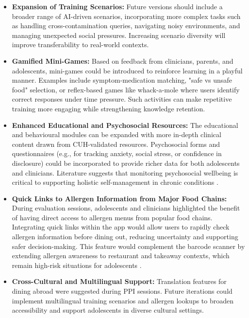 \documentclass[MScCS]{uccthesis}
\begin{document}
\begin{itemize}
    \item \textbf{Expansion of Training Scenarios:} Future versions should include a broader range of AI-driven scenarios, incorporating more complex tasks such as handling cross-contamination queries, navigating noisy environments, and managing unexpected social pressures. Increasing scenario diversity will improve transferability to real-world contexts.  

    \item \textbf{Gamified Mini-Games:} Based on feedback from clinicians, parents, and adolescents, mini-games could be introduced to reinforce learning in a playful manner. Examples include symptom-medication matching, "safe vs unsafe food" selection, or reflex-based games like whack-a-mole where users identify correct responses under time pressure. Such activities can make repetitive training more engaging while strengthening knowledge retention.  

    \item \textbf{Enhanced Educational and Psychosocial Resources:} The educational and behavioural modules can be expanded with more in-depth clinical content drawn from CUH-validated resources. Psychosocial forms and questionnaires (e.g., for tracking anxiety, social stress, or confidence in disclosure) could be incorporated to provide richer data for both adolescents and clinicians. Literature suggests that monitoring psychosocial wellbeing is critical to supporting holistic self-management in chronic conditions \parencite{sullivan2024telehealth}.  

    \item \textbf{Quick Links to Allergen Information from Major Food Chains:}  
    During evaluation sessions, adolescents and clinicians highlighted the benefit of having direct access to allergen menus from popular food chains. Integrating quick links within the app would allow users to rapidly check allergen information before dining out, reducing uncertainty and supporting safer decision-making. This feature would complement the barcode scanner by extending allergen awareness to restaurant and takeaway contexts, which remain high-risk situations for adolescents \parencite{sullivan2024telehealth}.
 

    \item \textbf{Cross-Cultural and Multilingual Support:} Translation features for dining abroad were suggested during PPI sessions. Future iterations could implement multilingual training scenarios and allergen lookups to broaden accessibility and support adolescents in diverse cultural settings.  


\end{itemize}
\end{document}
